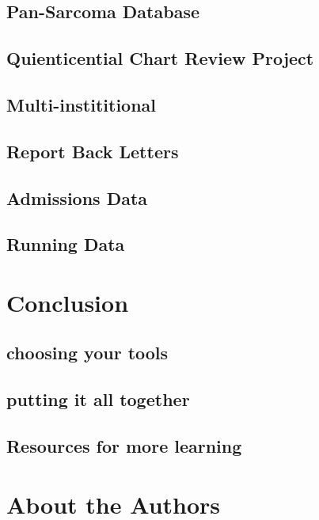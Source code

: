 \documentclass[
]{book}
\begin{document}
\section{Pan-Sarcoma Database}\label{pan-sarcoma-database}

\section{Quienticential Chart Review Project}\label{quienticential-chart-review-project}

\section{Multi-instititional}\label{multi-instititional}

\section{Report Back Letters}\label{report-back-letters}

\section{Admissions Data}\label{admissions-data}

\section{Running Data}\label{running-data}

\chapter{Conclusion}\label{conclusion}

\section{choosing your tools}\label{choosing-your-tools}

\section{putting it all together}\label{putting-it-all-together}

\section{Resources for more learning}\label{resources-for-more-learning}

\chapter{About the Authors}\label{about-the-authors}
\end{document}
